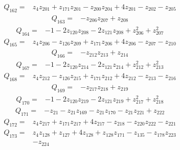 \[\begin{aligned}Q_{162}={}&z_{4}z_{201}+z_{171}z_{201}-z_{200}z_{204}+4z_{201}-z_{202}-z_{205}
\end{aligned}\]
\[\begin{aligned}Q_{163}={}&-z_{206}z_{207}+z_{208}
\end{aligned}\]
\[\begin{aligned}Q_{164}={}&-1-2z_{120}z_{208}-2z_{121}z_{208}+z_{206}^{2}+z_{207}^{2}
\end{aligned}\]
\[\begin{aligned}Q_{165}={}&z_{4}z_{206}-z_{126}z_{209}+z_{171}z_{206}+4z_{206}-z_{207}-z_{210}
\end{aligned}\]
\[\begin{aligned}Q_{166}={}&-z_{212}z_{213}+z_{214}
\end{aligned}\]
\[\begin{aligned}Q_{167}={}&-1-2z_{120}z_{214}-2z_{121}z_{214}+z_{212}^{2}+z_{213}^{2}
\end{aligned}\]
\[\begin{aligned}Q_{168}={}&z_{4}z_{212}-z_{126}z_{215}+z_{171}z_{212}+4z_{212}-z_{213}-z_{216}
\end{aligned}\]
\[\begin{aligned}Q_{169}={}&-z_{217}z_{218}+z_{219}
\end{aligned}\]
\[\begin{aligned}Q_{170}={}&-1-2z_{120}z_{219}-2z_{121}z_{219}+z_{217}^{2}+z_{218}^{2}
\end{aligned}\]
\[\begin{aligned}Q_{171}={}&-z_{21}-z_{21}z_{169}-z_{21}z_{170}-z_{21}z_{221}+z_{222}
\end{aligned}\]
\[\begin{aligned}Q_{172}={}&z_{4}z_{217}+z_{171}z_{217}+4z_{217}-z_{218}-z_{220}z_{222}-z_{221}
\end{aligned}\]
\[\begin{aligned}Q_{173}={}&z_{4}z_{128}+z_{127}+4z_{128}+z_{128}z_{171}-z_{135}-z_{178}z_{223}
\\&-z_{224}
\end{aligned}\]
